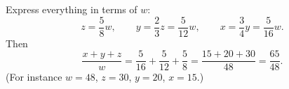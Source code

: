 Express everything in terms of $w$:
\[
z=\dfrac{5}{8}w,\qquad y=\dfrac{2}{3}z=\dfrac{5}{12}w,\qquad x=\dfrac{3}{4}y=\dfrac{5}{16}w .
\]
Then
\[
\dfrac{x+y+z}{w}=\dfrac{5}{16}+\dfrac{5}{12}+\dfrac{5}{8}=\dfrac{15+20+30}{48}=\boxed{\dfrac{65}{48}} .
\]
(For instance $w=48$, $z=30$, $y=20$, $x=15$.)
